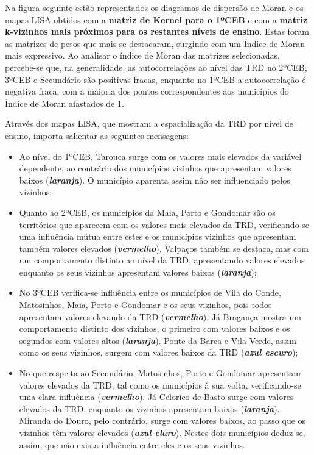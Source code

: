 \documentclass[
]{book}
\providecommand{\tightlist}{%
  \setlength{\itemsep}{0pt}\setlength{\parskip}{0pt}}
\begin{document}
Na figura seguinte estão representados os diagramas de dispersão de Moran e os mapas LISA obtidos com a \textbf{matriz de Kernel para o 1ºCEB} e com a \textbf{matriz k-vizinhos mais próximos para os restantes níveis de ensino}. Estas foram as matrizes de pesos que mais se destacaram, surgindo com um Índice de Moran mais expressivo. Ao analisar o índice de Moran das matrizes selecionadas, percebe-se que, na generalidade, as autocorrelações ao nível das TRD no 2ºCEB, 3ºCEB e Secundário são positivas fracas, enquanto no 1ºCEB a autocorrelação é negativa fraca, com a maioria dos pontos correspondentes aos municípios do Índice de Moran afastados de 1.

Através dos mapas LISA, que mostram a espacialização da TRD por nível de ensino, importa salientar as seguintes mensagens:

\begin{itemize}
\tightlist
\item
  Ao nível do 1ºCEB, Tarouca surge com os valores mais elevados da variável dependente, ao contrário dos municípios vizinhos que apresentam valores baixos (\textbf{\emph{laranja}}). O município aparenta assim não ser influenciado pelos vizinhos;
\item
  Quanto ao 2ºCEB, os municípios da Maia, Porto e Gondomar são os territórios que aparecem com os valores mais elevados da TRD, verificando-se uma influência mútua entre estes e os municípios vizinhos que apresentam também valores elevados (\textbf{\emph{vermelho}}). Valpaços também se destaca, mas com um comportamento distinto ao nível da TRD, apresentando valores elevados enquanto os seus vizinhos apresentam valores baixos (\textbf{\emph{laranja}});
\item
  No 3ºCEB verifica-se influência entre os municípios de Vila do Conde, Matosinhos, Maia, Porto e Gondomar e os seus vizinhos, pois todos apresentam valores elevando da TRD (\textbf{\emph{vermelho}}). Já Bragança mostra um comportamento distinto dos vizinhos, o primeiro com valores baixos e os segundos com valores altos (\textbf{\emph{laranja}}). Ponte da Barca e Vila Verde, assim como os seus vizinhos, surgem com valores baixos da TRD (\textbf{\emph{azul escuro}});
\item
  No que respeita ao Secundário, Matosinhos, Porto e Gondomar apresentam valores elevados da TRD, tal como os municípios à sua volta, verificando-se uma clara influência (\textbf{\emph{vermelho}}). Já Celorico de Basto surge com valores elevados da TRD, enquanto os vizinhos apresentam baixos (\textbf{\emph{laranja}}). Miranda do Douro, pelo contrário, surge com valores baixos, ao passo que os vizinhos têm valores elevados (\textbf{\emph{azul claro}}). Nestes dois municípios deduz-se, assim, que não exista influência entre eles e os seus vizinhos.
\end{itemize}
\end{document}
